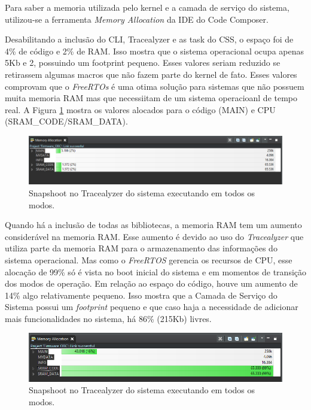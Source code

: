 Para saber a memoria utilizada pelo kernel e a camada de serviço do sistema, utilizou-se a ferramenta \textit{Memory Allocation} da IDE do Code Composer. 

Desabilitando a inclusão do CLI, Tracealyzer e as task do CSS, o espaço foi de 4\% de código e 2\% de RAM. Isso mostra que o sistema operacional ocupa apenas 5Kb e 2, possuindo um footprint pequeno. Esses valores seriam reduzido se retirassem algumas macros que não fazem parte do kernel de fato. Esses valores comprovam que o \textit{FreeRTOs} é uma otima solução para sistemas que não possuem muita memoria RAM mas que necessiitam de um sistema operacioanl de tempo real. A Figura \ref{memoryAllocation_RTOS} mostra os valores alocados para o código (MAIN) e CPU (SRAM\_CODE/SRAM\_DATA).

\begin{figure}[h]
	\centering
	\caption{Snapshoot no Tracealyzer do sistema executando em todos os modos.}
	\includegraphics[keepaspectratio=true,scale=0.6]{figuras/memoryAllocation_RTOS.PNG}
	
	\label{memoryAllocation_RTOS}
\end{figure}

Quando há a inclusão de todas as bibliotecas, a memoria RAM tem um aumento considerável na memoria RAM. Esse aumento é devido ao uso do \textit{Tracealyzer} que utiliza parte da memoria RAM para o armazenamento das informações do sistema operacional. Mas como o \textit{FreeRTOS} gerencia os recursos de CPU, esse alocação de 99\% só é vista no boot inicial do sistema e em momentos de transição dos modos de operação. Em relação ao espaço do código, houve um aumento de 14\% algo relativamente pequeno. Isso mostra que a Camada de Serviço do Sistema possui um \textit{footprint} pequeno e que caso haja a necessidade de adicionar mais funcionalidades no sistema, há 86\% (215Kb) livres. 

\begin{figure}[h]
	\centering
	\caption{Snapshoot no Tracealyzer do sistema executando em todos os modos.}
	\includegraphics[keepaspectratio=true,scale=0.61]{figuras/memoryAllocation_Full.PNG}
	
	\label{memoryAllocation_Full}
\end{figure}

